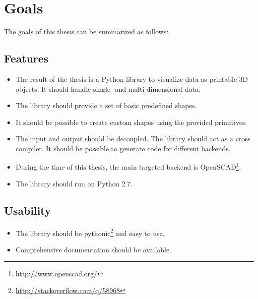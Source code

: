 
\chapter{Goals}

\label{ch:goals}

The goals of this thesis can be summarized as follows:


\section{Features}

\begin{itemize}
	\item The result of the thesis is a Python library to visualize data as
		printable 3D objects. It should handle single- and multi-dimensional data.
	\item The library should provide a set of basic predefined shapes.
	\item It should be possible to create custom shapes using the provided
		primitives.
	\item The input and output should be decoupled. The library should act as a
		cross compiler. It should be possible to generate code for different
		backends.
	\item During the time of this thesis, the main targeted backend is
		OpenSCAD\footnote{\url{http://www.openscad.org/}}.
	\item The library should run on Python 2.7.
\end{itemize}


\section{Usability}

\begin{itemize}
	\item The library should be
		pythonic\footnote{\url{http://stackoverflow.com/q/58968}} and easy to use.
	\item Comprehensive documentation should be available.
\end{itemize}



